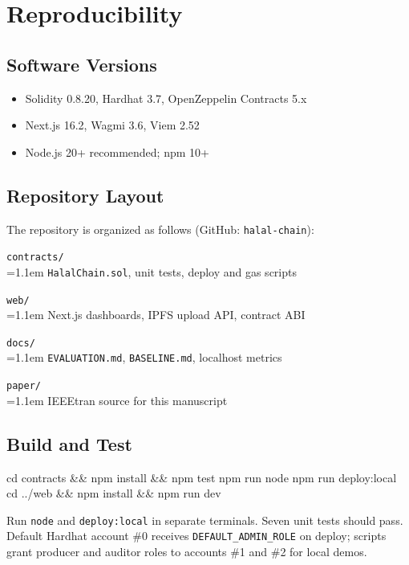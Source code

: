 \section{Reproducibility}
\label{app:repro}

\subsection{Software Versions}
\begin{itemize}
  \item Solidity 0.8.20, Hardhat 3.7, OpenZeppelin Contracts 5.x
  \item Next.js 16.2, Wagmi 3.6, Viem 2.52
  \item Node.js 20+ recommended; npm 10+
\end{itemize}

\subsection{Repository Layout}
The repository is organized as follows (GitHub: \texttt{halal-chain}):

\vspace{0.2em}
\noindent\texttt{contracts/}\\
\noindent\hspace{1.1em}\hangindent=1.1em
\texttt{HalalChain.sol}, unit tests, deploy and gas scripts

\vspace{0.15em}
\noindent\texttt{web/}\\
\noindent\hspace{1.1em}\hangindent=1.1em
Next.js dashboards, IPFS upload API, contract ABI

\vspace{0.15em}
\noindent\texttt{docs/}\\
\noindent\hspace{1.1em}\hangindent=1.1em
\texttt{EVALUATION.md}, \texttt{BASELINE.md}, localhost metrics

\vspace{0.15em}
\noindent\texttt{paper/}\\
\noindent\hspace{1.1em}\hangindent=1.1em
IEEEtran source for this manuscript

\subsection{Build and Test}
\begin{Code}
cd contracts && npm install && npm test
npm run node
npm run deploy:local
cd ../web && npm install && npm run dev
\end{Code}
Run \texttt{node} and \texttt{deploy:local} in separate terminals.
Seven unit tests should pass.
Default Hardhat account \#0 receives \texttt{DEFAULT\_ADMIN\_ROLE} on deploy; scripts grant producer and auditor roles to accounts \#1 and \#2 for local demos.

